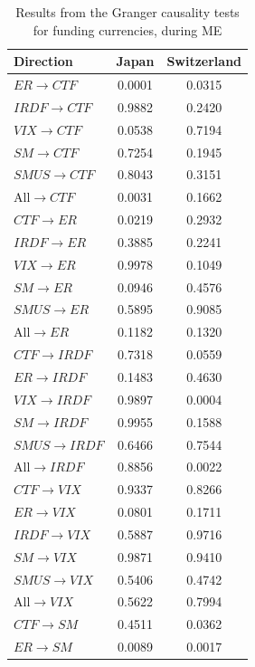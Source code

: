 \documentclass[a4paper, twoside]{templates/ociamthesis}
\begin{document}
\clearpage

\begin{table}[H]

\caption{\label{tab:Granger2}Results from the Granger causality tests for funding currencies, during ME}
\centering
\fontsize{10}{12}\selectfont
\begin{tabular}[t]{lcc}
\toprule
Direction & Japan & Switzerland\\
\midrule
$ER$$\rightarrow$$CTF$ & 0.0001 & 0.0315\\
$IRDF$$\rightarrow$$CTF$ & 0.9882 & 0.2420\\
$VIX$$\rightarrow$$CTF$ & 0.0538 & 0.7194\\
$SM$$\rightarrow$$CTF$ & 0.7254 & 0.1945\\
$SMUS$$\rightarrow$$CTF$ & 0.8043 & 0.3151\\
All$\rightarrow$$CTF$ & 0.0031 & 0.1662\\
\addlinespace
$CTF$$\rightarrow$$ER$ & 0.0219 & 0.2932\\
$IRDF$$\rightarrow$$ER$ & 0.3885 & 0.2241\\
$VIX$$\rightarrow$$ER$ & 0.9978 & 0.1049\\
$SM$$\rightarrow$$ER$ & 0.0946 & 0.4576\\
$SMUS$$\rightarrow$$ER$ & 0.5895 & 0.9085\\
All$\rightarrow$$ER$ & 0.1182 & 0.1320\\
\addlinespace
$CTF$$\rightarrow$$IRDF$ & 0.7318 & 0.0559\\
$ER$$\rightarrow$$IRDF$ & 0.1483 & 0.4630\\
$VIX$$\rightarrow$$IRDF$ & 0.9897 & 0.0004\\
$SM$$\rightarrow$$IRDF$ & 0.9955 & 0.1588\\
$SMUS$$\rightarrow$$IRDF$ & 0.6466 & 0.7544\\
All$\rightarrow$$IRDF$ & 0.8856 & 0.0022\\
\addlinespace
$CTF$$\rightarrow$$VIX$ & 0.9337 & 0.8266\\
$ER$$\rightarrow$$VIX$ & 0.0801 & 0.1711\\
$IRDF$$\rightarrow$$VIX$ & 0.5887 & 0.9716\\
$SM$$\rightarrow$$VIX$ & 0.9871 & 0.9410\\
$SMUS$$\rightarrow$$VIX$ & 0.5406 & 0.4742\\
All$\rightarrow$$VIX$ & 0.5622 & 0.7994\\
\addlinespace
$CTF$$\rightarrow$$SM$ & 0.4511 & 0.0362\\
$ER$$\rightarrow$$SM$ & 0.0089 & 0.0017\\

\end{tabular}
\end{table}
\end{document}
